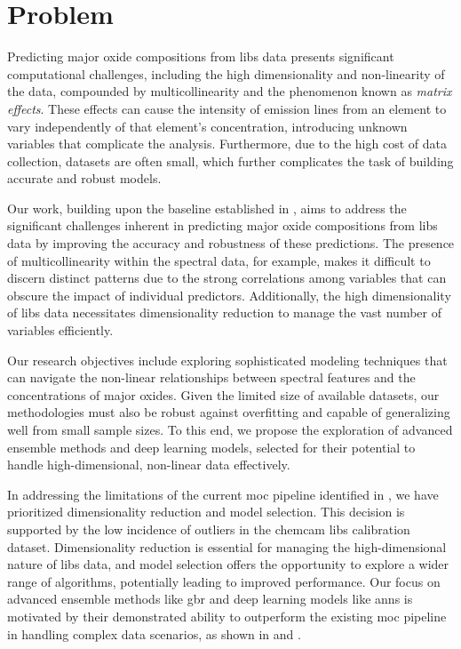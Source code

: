 \section{Problem}
\label{sec:problem_definition}

Predicting major oxide compositions from \gls{libs} data presents significant computational challenges, including the high dimensionality and non-linearity of the data, compounded by multicollinearity and the phenomenon known as \textit{matrix effects}.
These effects can cause the intensity of emission lines from an element to vary independently of that element's concentration, introducing unknown variables that complicate the analysis.
Furthermore, due to the high cost of data collection, datasets are often small, which further complicates the task of building accurate and robust models.

Our work, building upon the baseline established in \citet{p9_paper}, aims to address the significant challenges inherent in predicting major oxide compositions from \gls{libs} data by improving the accuracy and robustness of these predictions.
The presence of multicollinearity within the spectral data, for example, makes it difficult to discern distinct patterns due to the strong correlations among variables that can obscure the impact of individual predictors.
Additionally, the high dimensionality of \gls{libs} data necessitates dimensionality reduction to manage the vast number of variables efficiently.

Our research objectives include exploring sophisticated modeling techniques that can navigate the non-linear relationships between spectral features and the concentrations of major oxides.
Given the limited size of available datasets, our methodologies must also be robust against overfitting and capable of generalizing well from small sample sizes.
To this end, we propose the exploration of advanced ensemble methods and deep learning models, selected for their potential to handle high-dimensional, non-linear data effectively.

In addressing the limitations of the current \gls{moc} pipeline identified in \citet{p9_paper}, we have prioritized dimensionality reduction and model selection.
This decision is supported by the low incidence of outliers in the \gls{chemcam} \gls{libs} calibration dataset.
Dimensionality reduction is essential for managing the high-dimensional nature of \gls{libs} data, and model selection offers the opportunity to explore a wider range of algorithms, potentially leading to improved performance.
Our focus on advanced ensemble methods like \gls{gbr} and deep learning models like \gls{ann}s is motivated by their demonstrated ability to outperform the existing \gls{moc} pipeline in handling complex data scenarios, as shown in \citet{p9_paper} and \citet{andersonPostlandingMajorElement2022}.

